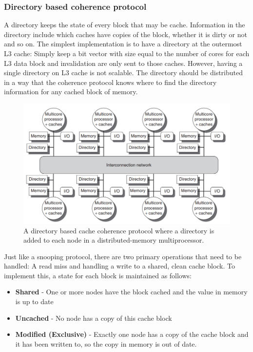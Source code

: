 \documentclass[11pt]{article}
\begin{document}
\subsubsection{Directory based coherence protocol}
A directory keeps the state of every block that may be cache. Information in the directory include which caches have copies of the block, whether it is dirty or not and so on. The simplest implementation is to have a directory at the outermost L3 cache: Simply keep a bit vector with size equal to the number of cores for each L3 data block and invalidation are only sent to those caches. 
\n
However, having a single directory on L3 cache is not scalable. The directory should be distributed in a way that the coherence protocol knows where to find the directory information for any cached block of memory. 
\begin{figure}[H]
\centering
\includegraphics[width=1\textwidth, keepaspectratio]{imgs/directory-based.png}
\caption{A directory based cache coherence protocol where a directory is added to each node in a distributed-memory multiprocessor.}
\end{figure}
\noindent
Just like a snooping protocol, there are two primary operations that need to be handled: A read miss and handling a write to a shared, clean cache block. To implement this, a state for each block is maintained as follows:
\begin{itemize}
\item \textbf{Shared} - One or more nodes have the block cached and the value in memory is up to date
\item \textbf{Uncached} - No node has a copy of this cache block
\item \textbf{Modified (Exclusive)} - Exactly one node has a copy of the cache block and it has been written to, so the copy in memory is out of date. 
\end{itemize}
\end{document}
